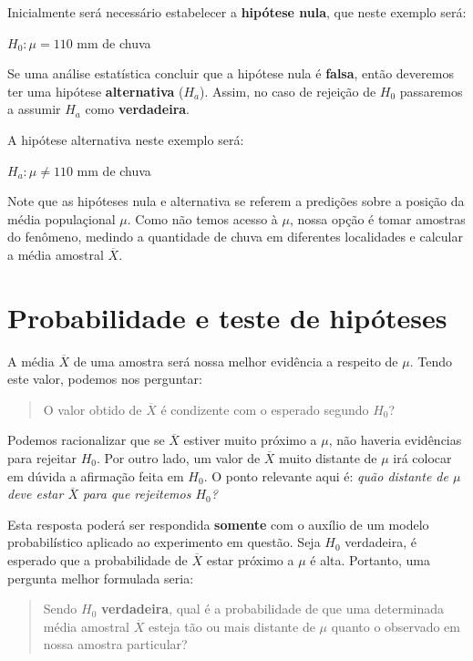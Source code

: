 \documentclass[
]{book}
\begin{document}
Inicialmente será necessário estabelecer a \textbf{hipótese nula}, que neste exemplo será:

\(H_0: \mu = 110\) mm de chuva

Se uma análise estatística concluir que a hipótese nula é \textbf{falsa}, então deveremos ter uma hipótese \textbf{alternativa} (\(H_a\)). Assim, no caso de rejeição de \(H_0\) passaremos a assumir \(H_a\) como \textbf{verdadeira}.

A hipótese alternativa neste exemplo será:

\(H_a: \mu \ne 110\) mm de chuva

Note que as hipóteses nula e alternativa se referem a predições sobre a posição da média populaçional \(\mu\). Como não temos acesso à \(\mu\), nossa opção é tomar amostras do fenômeno, medindo a quantidade de chuva em diferentes localidades e calcular a média amostral \(\overline{X}\).

\hypertarget{probabilidade-e-teste-de-hipuxf3teses}{%
\section{Probabilidade e teste de hipóteses}\label{probabilidade-e-teste-de-hipuxf3teses}}

A média \(\overline{X}\) de uma amostra será nossa melhor evidência a respeito de \(\mu\). Tendo este valor, podemos nos perguntar:

\begin{quote}
O valor obtido de \(\overline{X}\) é condizente com o esperado segundo \(H_0\)?
\end{quote}

Podemos racionalizar que se \(\overline{X}\) estiver muito próximo a \(\mu\), não haveria evidências para rejeitar \(H_0\). Por outro lado, um valor de \(\overline{X}\) muito distante de \(\mu\) irá colocar em dúvida a afirmação feita em \(H_0\). O ponto relevante aqui é: \emph{quão distante de \(\mu\) deve estar \(\overline{X}\) para que rejeitemos \(H_0\)?}

Esta resposta poderá ser respondida \textbf{somente} com o auxílio de um modelo probabilístico aplicado ao experimento em questão. Seja \(H_0\) verdadeira, é esperado que a probabilidade de \(\overline{X}\) estar próximo a \(\mu\) é alta. Portanto, uma pergunta melhor formulada seria:

\begin{quote}
Sendo \(H_0\) \textbf{verdadeira}, qual é a probabilidade de que uma determinada média amostral \(\overline{X}\) esteja tão ou mais distante de \(\mu\) quanto o observado em nossa amostra particular?
\end{quote}
\end{document}
